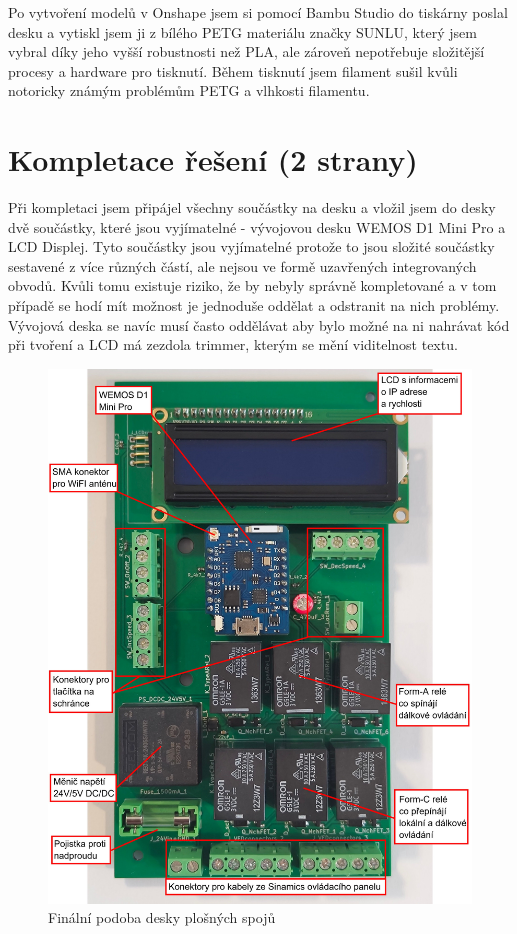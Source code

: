 Po vytvoření modelů v Onshape jsem si pomocí Bambu Studio do tiskárny poslal desku a vytiskl jsem ji z bílého PETG materiálu značky SUNLU, který jsem vybral díky jeho vyšší robustnosti než PLA, ale zároveň nepotřebuje složitější procesy a hardware pro tisknutí. Během tisknutí jsem filament sušil kvůli notoricky známým problémům PETG a vlhkosti filamentu.

\section{Kompletace řešení (2 strany)}

Při kompletaci jsem připájel všechny součástky na desku a vložil jsem do desky dvě součástky, které jsou vyjímatelné - vývojovou desku WEMOS D1 Mini Pro a LCD Displej. Tyto součástky jsou vyjímatelné protože to jsou složité součástky sestavené z více různých částí, ale nejsou ve formě uzavřených integrovaných obvodů. Kvůli tomu existuje riziko, že by nebyly správně kompletované a v tom případě se hodí mít možnost je jednoduše oddělat a odstranit na nich problémy. Vývojová deska se navíc musí často oddělávat aby bylo možné na ni nahrávat kód při tvoření a LCD má zezdola trimmer, kterým se mění viditelnost textu.

\begin{figure}[H]
    \centering
    \includegraphics[width=0.95\linewidth]{images/PCB_Final_annotated.jpg}
    \caption{Finální podoba desky plošných spojů}
    \label{fig:PCBFinal}
\end{figure}

